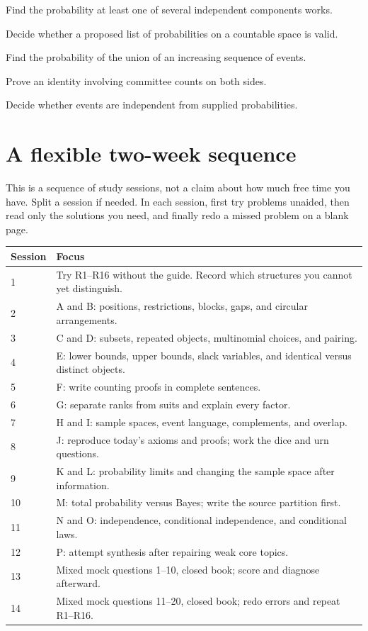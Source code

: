 \documentclass[11pt]{article}
\newcommand{\qid}[1]{\par\needspace{5\baselineskip}\noindent{\color{accent}\bfseries #1}\quad}
\begin{document}
\qid{R12} Find the probability at least one of several independent components works.\par\vspace{0.19in}
\qid{R13} Decide whether a proposed list of probabilities on a countable space is valid.\par\vspace{0.19in}
\qid{R14} Find the probability of the union of an increasing sequence of events.\par\vspace{0.19in}
\qid{R15} Prove an identity involving committee counts on both sides.\par\vspace{0.19in}
\qid{R16} Decide whether events are independent from supplied probabilities.\par\vspace{0.19in}\clearpage\section*{A flexible two-week sequence}
This is a sequence of study sessions, not a claim about how much free time you have. Split a session if needed. In each session, first try problems unaided, then read only the solutions you need, and finally redo a missed problem on a blank page.
\begin{longtable}{p{0.6in}p{5.7in}}
\toprule Session & Focus\\\midrule
1 & Try R1--R16 without the guide. Record which structures you cannot yet distinguish.\\
2 & A and B: positions, restrictions, blocks, gaps, and circular arrangements.\\
3 & C and D: subsets, repeated objects, multinomial choices, and pairing.\\
4 & E: lower bounds, upper bounds, slack variables, and identical versus distinct objects.\\
5 & F: write counting proofs in complete sentences.\\
6 & G: separate ranks from suits and explain every factor.\\
7 & H and I: sample spaces, event language, complements, and overlap.\\
8 & J: reproduce today's axioms and proofs; work the dice and urn questions.\\
9 & K and L: probability limits and changing the sample space after information.\\
10 & M: total probability versus Bayes; write the source partition first.\\
11 & N and O: independence, conditional independence, and conditional laws.\\
12 & P: attempt synthesis after repairing weak core topics.\\
13 & Mixed mock questions 1--10, closed book; score and diagnose afterward.\\
14 & Mixed mock questions 11--20, closed book; redo errors and repeat R1--R16.\\\bottomrule
\end{longtable}
\end{document}

